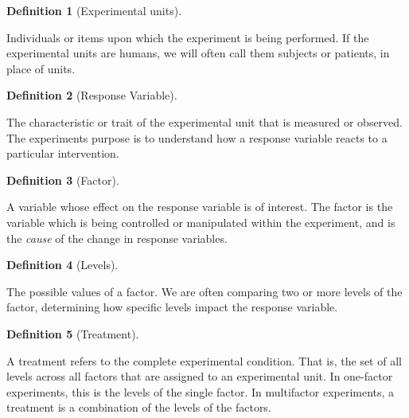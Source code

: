 \documentclass[
  letterpaper,
  DIV=11,
  numbers=noendperiod]{scrreprt}
\theoremstyle{definition}
\theoremstyle{definition}
\theoremstyle{definition}
\newtheorem{definition}{Definition}[chapter]
\theoremstyle{remark}
\begin{document}
\begin{definition}[Experimental
units]\protect\hypertarget{def-experimental-unit}{}\label{def-experimental-unit}

Individuals or items upon which the experiment is being performed. If
the experimental units are humans, we will often call them subjects or
patients, in place of units.

\end{definition}

\begin{definition}[Response
Variable]\protect\hypertarget{def-response-variable}{}\label{def-response-variable}

The characteristic or trait of the experimental unit that is measured or
observed. The experiments purpose is to understand how a response
variable reacts to a particular intervention.

\end{definition}

\begin{definition}[Factor]\protect\hypertarget{def-factor}{}\label{def-factor}

A variable whose effect on the response variable is of interest. The
factor is the variable which is being controlled or manipulated within
the experiment, and is the \emph{cause} of the change in response
variables.

\end{definition}

\begin{definition}[Levels]\protect\hypertarget{def-levels}{}\label{def-levels}

The possible values of a factor. We are often comparing two or more
levels of the factor, determining how specific levels impact the
response variable.

\end{definition}

\begin{definition}[Treatment]\protect\hypertarget{def-treatment}{}\label{def-treatment}

A treatment refers to the complete experimental condition. That is, the
set of all levels across all factors that are assigned to an
experimental unit. In one-factor experiments, this is the levels of the
single factor. In multifactor experiments, a treatment is a combination
of the levels of the factors.

\end{definition}
\end{document}
